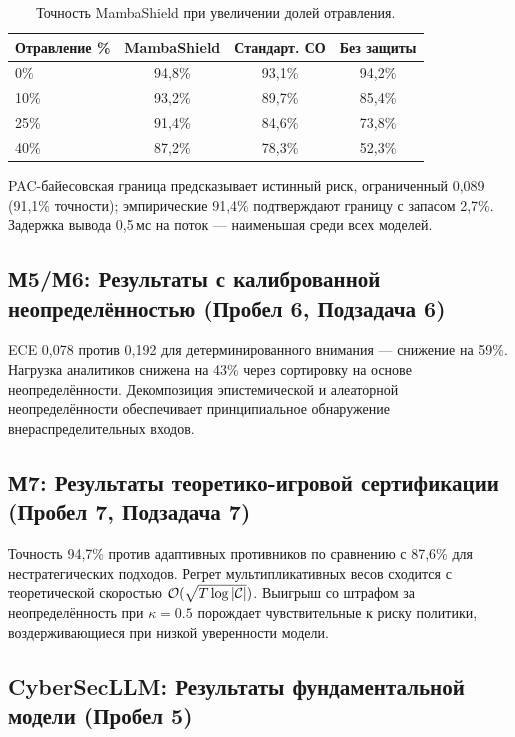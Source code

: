 \begin{table}[htbp]
\centering
\caption{Точность MambaShield при увеличении долей отравления.}
\label{tab:mamba_results}
\begin{tabular}{lccc}
\toprule
Отравление \% & MambaShield & Стандарт. СО & Без защиты \\
\midrule
0\%  & 94,8\% & 93,1\% & 94,2\% \\
10\% & 93,2\% & 89,7\% & 85,4\% \\
25\% & 91,4\% & 84,6\% & 73,8\% \\
40\% & 87,2\% & 78,3\% & 52,3\% \\
\bottomrule
\end{tabular}
\end{table}

PAC-байесовская граница предсказывает истинный риск, ограниченный 0,089 (91,1\% точности); эмпирические 91,4\% подтверждают границу с запасом 2,7\%. Задержка вывода 0,5\,мс на поток --- наименьшая среди всех моделей.


\subsection{М5/М6: Результаты с калиброванной неопределённостью (Пробел 6, Подзадача 6)}

ECE 0,078 против 0,192 для детерминированного внимания --- снижение на 59\%. Нагрузка аналитиков снижена на 43\% через сортировку на основе неопределённости. Декомпозиция эпистемической и алеаторной неопределённости обеспечивает принципиальное обнаружение внераспределительных входов.


\subsection{М7: Результаты теоретико-игровой сертификации (Пробел 7, Подзадача 7)}

Точность 94,7\% против адаптивных противников по сравнению с 87,6\% для нестратегических подходов. Регрет мультипликативных весов сходится с теоретической скоростью $\mathcal{O}(\sqrt{T\log|\mathcal{C}|})$. Выигрыш со штрафом за неопределённость при $\kappa=0.5$ порождает чувствительные к риску политики, воздерживающиеся при низкой уверенности модели.


\subsection{CyberSecLLM: Результаты фундаментальной модели (Пробел 5)}

